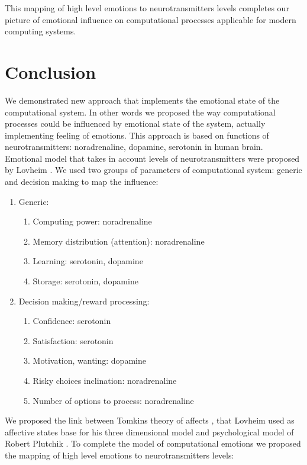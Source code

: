 This mapping of high level emotions to neurotransmitters levels completes our picture of emotional influence on computational processes applicable for modern computing systems.

\section{Conclusion}

We demonstrated new approach that implements the emotional state of the computational system. In other words we proposed the way computational processes could be influenced by emotional state of the system, actually implementing feeling of emotions. This approach is based on functions of neurotransmitters: noradrenaline, dopamine, serotonin in human brain. Emotional model that takes in account levels of neurotransmitters were proposed by Lovheim \cite{cubeofemotions}. We used two groups of parameters of computational system: generic and decision making to map the influence:

\begin{enumerate}
 \item  Generic:
 \begin{enumerate}
  \item  Computing power: noradrenaline
  \item  Memory distribution (attention): noradrenaline
  \item  Learning: serotonin, dopamine
  \item  Storage: serotonin, dopamine
 \end{enumerate}
 \item  Decision making/reward processing:
 \begin{enumerate}
  \item  Confidence: serotonin
  \item  Satisfaction: serotonin
  \item  Motivation, wanting: dopamine
  \item  Risky choices inclination: noradrenaline
  \item  Number of options to process: noradrenaline
 \end{enumerate}
\end{enumerate}

We proposed the link between Tomkins theory of affects \cite{tomkins1, tomkins2, tomkins3, quest}, that Lovheim used as affective states base for his three dimensional model and psychological model of Robert Plutchik  \cite{natureofemotions}. To complete the model of computational emotions we proposed the mapping of high level emotions to neurotransmitters levels:

